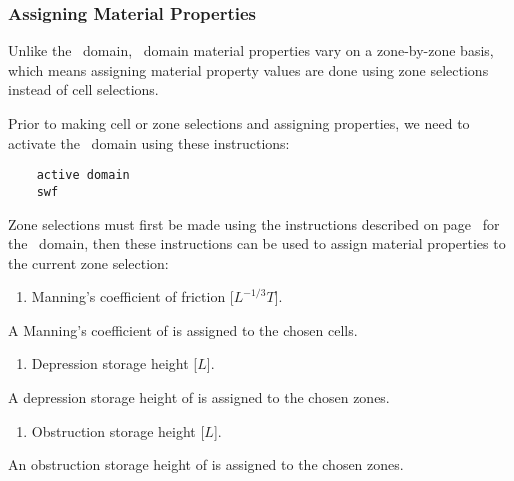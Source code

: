 \subsubsection{Assigning Material Properties}  
Unlike the \gwf\ domain, \swf\ domain material properties vary on a zone-by-zone basis, which means assigning material property values are done using zone selections instead of cell selections.

%
Prior to making cell or zone selections and assigning properties, we need to activate the \swf\ domain using these instructions:
\begin{verbatim}
    active domain
    swf
\end{verbatim}

Zone selections must first be made using the instructions described on page~\pageref{page:zoneSelect} for the \gwf\ domain, then these instructions can be used to assign material properties to the current zone selection:

    {
        \squish
        \begin{enumerate}
        \item {}  Manning's coefficient of friction [$L^{-1/3} T$].
        \end{enumerate}
          A Manning's coefficient of  is assigned to the chosen cells.
    }

    {
        \squish
        \begin{enumerate}
        \item {}  Depression storage height [$L$].
        \end{enumerate}
          A depression storage height of  is assigned to the chosen zones.
    }

    {
        \squish
        \begin{enumerate}
        \item {}  Obstruction storage height [$L$].
        \end{enumerate}
          An obstruction storage height of  is assigned to the chosen zones.
    }

